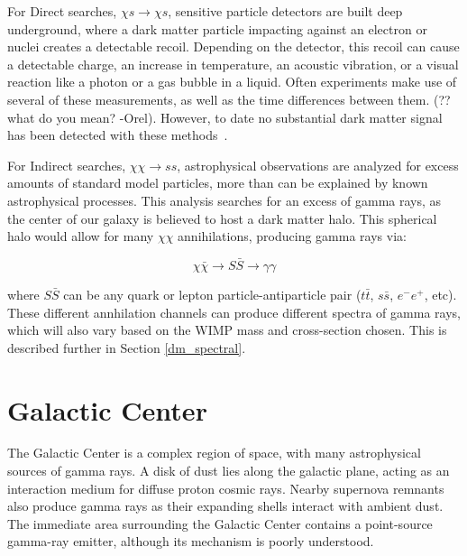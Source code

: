     For Direct searches, $\chi s \rightarrow \chi s$, sensitive particle detectors are built deep underground, where a dark matter particle impacting against an electron or nuclei creates a detectable recoil.
    Depending on the detector, this recoil can cause a detectable charge, an increase in temperature, an acoustic vibration, or a visual reaction like a photon or a gas bubble in a liquid.
    Often experiments make use of several of these measurements, as well as the time differences between them. {\color{red}(?? what do you mean? -Orel)}.
    However, to date no substantial dark matter signal has been detected with these methods~\cite{direct_dm_detection}.

    For Indirect searches, $\chi\chi \rightarrow ss$, astrophysical observations are analyzed for excess amounts of standard model particles, more than can be explained by known astrophysical processes.
    This analysis searches for an excess of gamma rays, as the center of our galaxy is believed to host a dark matter halo.
    This spherical halo would allow for many $\chi\chi$ annihilations, producing gamma rays via: 

    $$\chi\bar{\chi} \rightarrow S\bar{S} \rightarrow \gamma\gamma$$

    where $S\bar{S}$ can be any quark or lepton particle-antiparticle pair ($t\bar{t}$, $s\bar{s}$, $e^{-}e^{+}$, etc).
    These different annhilation channels can produce different spectra of gamma rays, which will also vary based on the WIMP mass and cross-section chosen.
    This is described further in Section \ref{dm_spectral}.

\FloatBarrier

\section{Galactic Center}

  The Galactic Center is a complex region of space, with many astrophysical sources of gamma rays.
  A disk of dust lies along the galactic plane, acting as an interaction medium for diffuse proton cosmic rays.
  Nearby supernova remnants also produce gamma rays as their expanding shells interact with ambient dust.
  The immediate area surrounding the Galactic Center contains a point-source gamma-ray emitter, although its mechanism is poorly understood.

